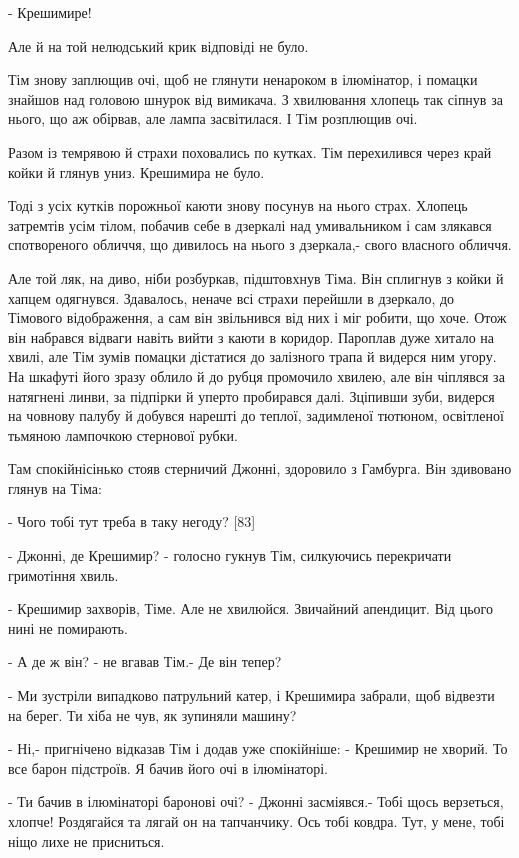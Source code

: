 - Крешимире!

Але й на той нелюдський крик відповіді не було.

Тім знову заплющив очі, щоб не глянути ненароком в ілюмінатор, і помацки знайшов над головою шнурок від вимикача. З хвилювання хлопець так сіпнув за нього, що аж обірвав, але лампа засвітилася. І Тім розплющив очі.

Разом із темрявою й страхи поховались по кутках. Тім перехилився через край койки й глянув униз. Крешимира не було.

Тоді з усіх кутків порожньої каюти знову посунув на нього страх. Хлопець затремтів усім тілом, побачив себе в дзеркалі над умивальником і сам злякався спотвореного обличчя, що дивилось на нього з дзеркала,- свого власного обличчя.

Але той ляк, на диво, ніби розбуркав, підштовхнув Тіма. Він сплигнув з койки й хапцем одягнувся. Здавалось, неначе всі страхи перейшли в дзеркало, до Тімового відображення, а сам він звільнився від них і міг робити, що хоче. Отож він набрався відваги навіть вийти з каюти в коридор. Пароплав дуже хитало на хвилі, але Тім зумів помацки дістатися до залізного трапа й видерся ним угору. На шкафуті його зразу облило й до рубця промочило хвилею, але він чіплявся за натягнені линви, за підпірки й уперто пробирався далі. Зціпивши зуби, видерся на човнову палубу й добувся нарешті до теплої, задимленої тютюном, освітленої тьмяною лампочкою стернової рубки.

Там спокійнісінько стояв стерничий Джонні, здоровило з Гамбурга. Він здивовано глянув на Тіма:

- Чого тобі тут треба в таку негоду? [83]

- Джонні, де Крешимир? - голосно гукнув Тім, силкуючись перекричати гримотіння хвиль.

- Крешимир захворів, Тіме. Але не хвилюйся. Звичайний апендицит. Від цього нині не помирають.

- А де ж він? - не вгавав Тім.- Де він тепер?

- Ми зустріли випадково патрульний катер, і Крешимира забрали, щоб відвезти на берег. Ти хіба не чув, як зупиняли машину?

- Ні,- пригнічено відказав Тім і додав уже спокійніше: - Крешимир не хворий. То все барон підстроїв. Я бачив його очі в ілюмінаторі.

- Ти бачив в ілюмінаторі баронові очі? - Джонні засміявся.- Тобі щось верзеться, хлопче! Роздягайся та лягай он на тапчанчику. Ось тобі ковдра. Тут, у мене, тобі ніщо лихе не присниться.

